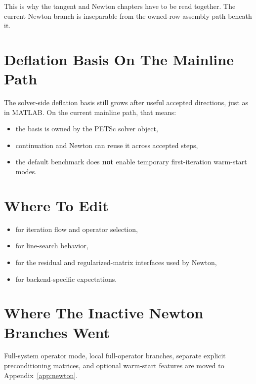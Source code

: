 This is why the tangent and Newton chapters have to be read together. The
current Newton branch is inseparable from the owned-row assembly path beneath
it.

\section{Deflation Basis On The Mainline Path}

The solver-side deflation basis still grows after useful accepted directions,
just as in MATLAB. On the current mainline path, that means:
\begin{itemize}
\item the basis is owned by the PETSc solver object,
\item continuation and Newton can reuse it across accepted steps,
\item the default benchmark does \textbf{not} enable temporary first-iteration
warm-start modes.
\end{itemize}

\section{Where To Edit}

\begin{itemize}
\item {} for iteration flow and operator selection,
\item {} for line-search behavior,
\item {} for the residual and regularized-matrix
interfaces used by Newton,
\item {} for backend-specific expectations.
\end{itemize}

\section{Where The Inactive Newton Branches Went}

Full-system operator mode, local full-operator branches, separate explicit
preconditioning matrices, and optional warm-start features are moved to
Appendix~\ref{app:newton}.
